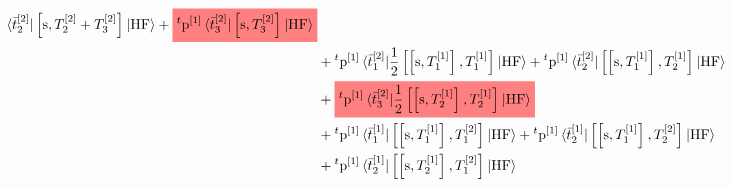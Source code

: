 \begin{equation}
\begin{aligned}
{    \braket{\tbar{2}^{[2]} | \commutator{\s}{T_2^{[2]} + T_3^{[2]}} | \mathrm{HF}}
    }
    +
    \highlight{
    {}^t\p^{[1]}
    \braket{\tbar{3}^{[2]} | \commutator{\s}{T_3^{[2]}} | \mathrm{HF}}
    } \\
    &+
    {}^t\p^{[1]}
    \braket{\tbar{1}^{[2]} |
    \frac{1}{2}\commutator{\commutator{\s}{T_1^{[1]}}}{T_1^{[1]}}
    | \mathrm{HF}}
    +
    {}^t\p^{[1]}
    \braket{\tbar{2}^{[2]} |
    \commutator{\commutator{\s}{T_1^{[1]}}}{T_2^{[1]}}
    | \mathrm{HF}} \\
    &+
    \highlight{
    {}^t\p^{[1]}
    \braket{\tbar{3}^{[2]} |
    \frac{1}{2}\commutator{\commutator{\s}{T_2^{[1]}}}{T_2^{[1]}}
    | \mathrm{HF}}
    } \\
    &+ {}^t\p^{[1]}
    \braket{\tbar{1}^{[1]} |
    \commutator{\commutator{\s}{T_1^{[1]}}}{T_1^{[2]}}
    | \mathrm{HF}}
    + {}^t\p^{[1]}
    \braket{\tbar{2}^{[1]} |
    \commutator{\commutator{\s}{T_1^{[1]}}}{T_2^{[2]}}
    | \mathrm{HF}} \\
    &+ {}^t\p^{[1]}
    \braket{\tbar{2}^{[1]} |
    \commutator{\commutator{\s}{T_2^{[1]}}}{T_1^{[2]}}
    | \mathrm{HF}}
  \end{aligned}
\end{equation}
